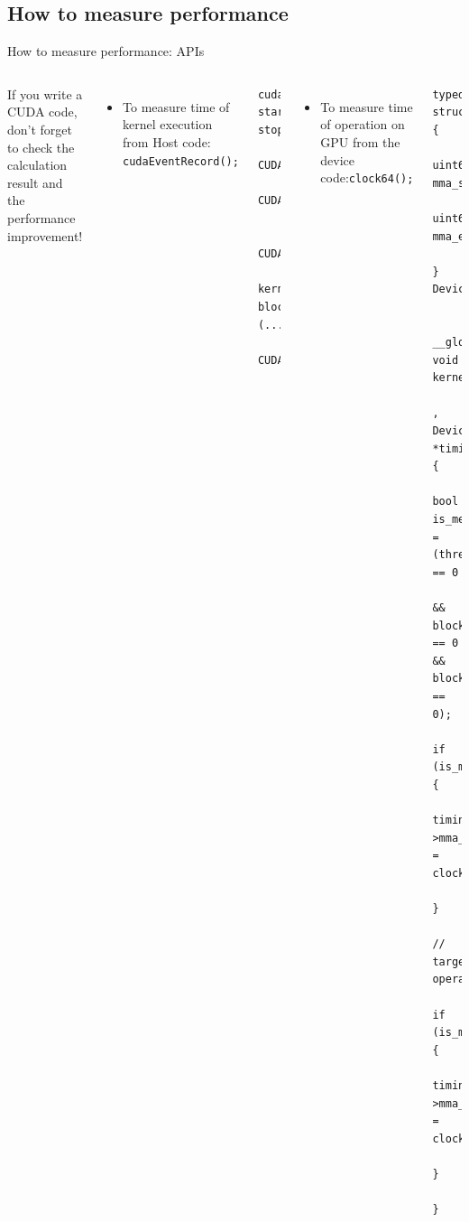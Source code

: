 \documentclass[dvipdfmx, 11pt, aspectratio=169]{beamer}   %
\begin{document}
\subsection{How to measure performance}
\begin{frame}[fragile]{How to measure performance: APIs}
\vspace{-\baselineskip}
\begin{columns}
\vspace{-\baselineskip}

If you write a CUDA code, don't forget to check the calculation result and the performance improvement!
\begin{itemize}
  \item To measure time of kernel execution from Host code: \lstinline|cudaEventRecord();|
\end{itemize}
\begin{lstlisting}[language=CUDA, basicstyle=\ttfamily\tiny]
    cudaEvent_t start, stop;
    CUDA_CHECK(cudaEventCreate(&start));
    CUDA_CHECK(cudaEventCreate(&stop));
    
    CUDA_CHECK(cudaEventRecord(start));
    kernel<<<grid, block>>>(...);
    CUDA_CHECK(cudaEventRecord(stop));
\end{lstlisting}
\begin{itemize}
  \item To measure time of operation on GPU from the device code:\lstinline|clock64();|
\end{itemize}
\begin{lstlisting}[language=CUDA, basicstyle=\ttfamily\tiny]
    typedef struct {
        uint64_t mma_start;
        uint64_t mma_end;
    } DeviceTimingInfo;

    __global__ void kernel(...
        , DeviceTimingInfo *timing_info) {
      bool is_measuring_thread = (threadIdx.x == 0 
              && blockIdx.x == 0 && blockIdx.y == 0);
      if (is_measuring_thread) {
          timing_info->mma_start = clock64();
      }
      // target operation
      if (is_measuring_thread) {
          timing_info->mma_end = clock64();
      }
    }
\end{lstlisting}
\end{columns}
\end{frame}
\end{document}
